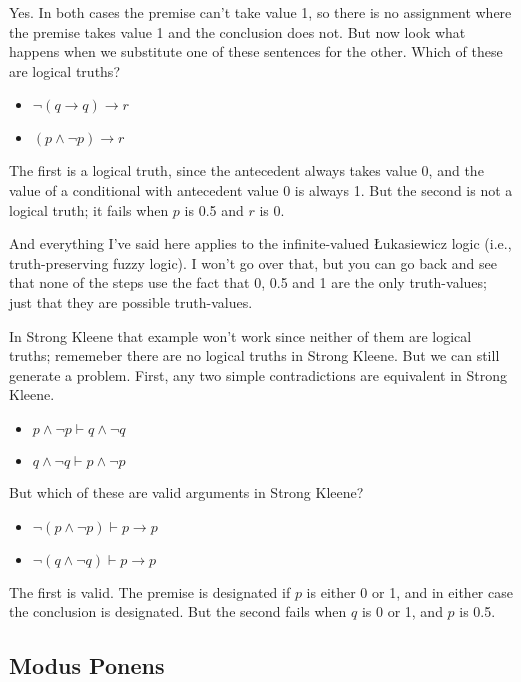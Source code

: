 \documentclass[
]{article}
\providecommand{\tightlist}{%
  \setlength{\itemsep}{0pt}\setlength{\parskip}{0pt}}\usepackage{longtable,booktabs,array}
\begin{document}
Yes. In both cases the premise can't take value 1, so there is no
assignment where the premise takes value 1 and the conclusion does not.
But now look what happens when we substitute one of these sentences for
the other. Which of these are logical truths?

\begin{itemize}
\tightlist
\item
  \(\neg (q \rightarrow q) \rightarrow r\)
\item
  \((p \wedge \neg p) \rightarrow r\)
\end{itemize}

The first is a logical truth, since the antecedent always takes value 0,
and the value of a conditional with antecedent value 0 is always 1. But
the second is not a logical truth; it fails when \(p\) is 0.5 and \(r\)
is 0.

And everything I've said here applies to the infinite-valued Łukasiewicz
logic (i.e., truth-preserving fuzzy logic). I won't go over that, but
you can go back and see that none of the steps use the fact that 0, 0.5
and 1 are the only truth-values; just that they are possible
truth-values.

In Strong Kleene that example won't work since neither of them are
logical truths; rememeber there are no logical truths in Strong Kleene.
But we can still generate a problem. First, any two simple
contradictions are equivalent in Strong Kleene.

\begin{itemize}
\tightlist
\item
  \(p \wedge \neg p \vdash q \wedge \neg q\)
\item
  \(q \wedge \neg q \vdash p \wedge \neg p\)
\end{itemize}

But which of these are valid arguments in Strong Kleene?

\begin{itemize}
\tightlist
\item
  \(\neg(p \wedge \neg p) \vdash p \rightarrow p\)
\item
  \(\neg(q \wedge \neg q) \vdash p \rightarrow p\)
\end{itemize}

The first is valid. The premise is designated if \(p\) is either 0 or 1,
and in either case the conclusion is designated. But the second fails
when \(q\) is 0 or 1, and \(p\) is 0.5.

\hypertarget{modus-ponens}{%
\subsection{Modus Ponens}\label{modus-ponens}}
\end{document}
